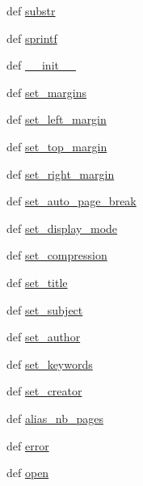 \begin{DoxyCompactItemize}
\item 
def \hyperlink{namespacemmasgis_1_1fpdf_a38d914abfdd066c8544f2af6706f463a}{substr}
\item 
def \hyperlink{namespacemmasgis_1_1fpdf_ab07be808f9b2a9d699e5e93e8d7a64e9}{sprintf}
\item 
def \hyperlink{namespacemmasgis_1_1fpdf_ad13a42fe304ede0c23862b0a7d4fe16b}{\_\-\_\-init\_\-\_\-}
\item 
def \hyperlink{namespacemmasgis_1_1fpdf_a59d382fc642fbf4f74df2c3e7d42ce4a}{set\_\-margins}
\item 
def \hyperlink{namespacemmasgis_1_1fpdf_a8286b0d6722ca9ba33ff6272539beaac}{set\_\-left\_\-margin}
\item 
def \hyperlink{namespacemmasgis_1_1fpdf_acc52542f495b0e3f35197692cd8b31ef}{set\_\-top\_\-margin}
\item 
def \hyperlink{namespacemmasgis_1_1fpdf_ad95255e788f94eaf1bff128029c97079}{set\_\-right\_\-margin}
\item 
def \hyperlink{namespacemmasgis_1_1fpdf_a9ceaca0ebad4302fbf2289d4be86cbaf}{set\_\-auto\_\-page\_\-break}
\item 
def \hyperlink{namespacemmasgis_1_1fpdf_a68881d8ac3e8d1f72203642e8f0d4255}{set\_\-display\_\-mode}
\item 
def \hyperlink{namespacemmasgis_1_1fpdf_a7ef5867e40bbaa31929fc4da230401b8}{set\_\-compression}
\item 
def \hyperlink{namespacemmasgis_1_1fpdf_a3b48fa237f65b0be09362efe79f5504c}{set\_\-title}
\item 
def \hyperlink{namespacemmasgis_1_1fpdf_ae2e58a9cc285c62860ab79b3c7f9459a}{set\_\-subject}
\item 
def \hyperlink{namespacemmasgis_1_1fpdf_ab1af7a39a21ab195977cd502f94f7722}{set\_\-author}
\item 
def \hyperlink{namespacemmasgis_1_1fpdf_ab8b1ebdfa2c087feb4caa42d3c330792}{set\_\-keywords}
\item 
def \hyperlink{namespacemmasgis_1_1fpdf_ae06dd01f7ad2c651bb502853ce0d5705}{set\_\-creator}
\item 
def \hyperlink{namespacemmasgis_1_1fpdf_a40553422a640fb8d44bf6eddc9840ed9}{alias\_\-nb\_\-pages}
\item 
def \hyperlink{namespacemmasgis_1_1fpdf_a08a4e15c22f6388dfa1badf22387d54e}{error}
\item 
def \hyperlink{namespacemmasgis_1_1fpdf_a3db12b5b2fface72aba2c9517f8f5462}{open}
\item 

\end{DoxyCompactItemize}
